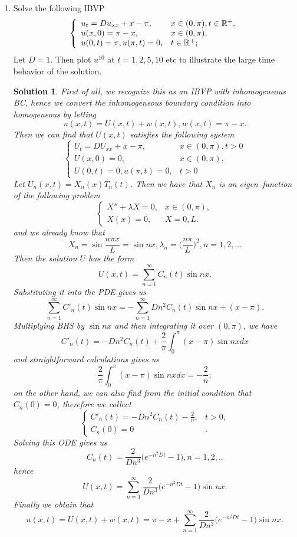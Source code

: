 \documentclass[6pt]{article}
\newtheorem{solution}{Solution}
\numberwithin{equation}{section}
\def\mathbb{\Bbb}
\begin{document}
\begin{enumerate}
\item Solve the following IBVP
\begin{equation}\label{4}
\left\{
\begin{array}{ll}
u_t=Du_{xx}+x-\pi,& x\in(0,\pi),t\in\mathbb R^+,\\
u(x,0)=\pi-x,&x\in(0,\pi),\\
u(0,t)=\pi, u(\pi,t)=0, &t\in\mathbb R^+;
\end{array}
\right.
\end{equation}
Let $D=1$.  Then plot $u^{10}$ at $t=1,2,5,10$ etc to illustrate the large time behavior of the solution.
\begin{solution}
First of all, we recognize this as an IBVP with inhomogeneous BC, hence we convert the inhomogeneous boundary condition into homogeneous by letting
\[u(x,t)=U(x,t)+w(x,t),w(x,t)=\pi-x.\]
Then we can find that $U(x,t)$ satisfies the following system
\begin{equation}\label{4homo}
\left\{
\begin{array}{ll}
U_t=DU_{xx}+x-\pi,& x\in(0,\pi),t>0\\
U(x,0)=0,&x\in(0,\pi),\\
U(0,t)=0, u(\pi,t)=0, &t>0
\end{array}
\right.
\end{equation}
Let $U_n(x,t)=X_n(x)T_n(t)$.  Then we have that $X_n$ is an eigen--function of the following problem
\begin{equation}
\left\{
\begin{array}{ll}
X''+\lambda X=0,& x\in(0,\pi),\\
X(x)=0, &X=0,L.
\end{array}
\right.
\end{equation}
and we already know that
\[X_n=\sin \frac{n\pi x}{L}=\sin nx,\lambda_n=\Big(\frac{n\pi}{L}\Big)^2,n=1,2,...\]
Then the solution $U$ has the form
\[U(x,t)=\sum_{n=1}^\infty C_n(t)\sin nx.\]
Substituting it into the PDE gives us
\[\sum_{n=1}^\infty C'_n(t)\sin nx=-\sum_{n=1}^\infty Dn^2C_n(t)\sin nx+(x-\pi).\]
Multiplying BHS by $\sin nx$ and then integrating it over $(0,\pi)$, we have
\[C'_n(t)=-Dn^2C_n(t)+\frac{2}{\pi}\int_0^\pi(x-\pi)\sin nx dx\]
and straightforward calculations gives us
\[\frac{2}{\pi}\int_0^\pi(x-\pi)\sin nx dx=-\frac{2}{n};\]
on the other hand, we can also find from the initial condition that $C_n(0)=0$, therefore we collect
\begin{equation}
\left\{
\begin{array}{ll}
C'_n(t)=-Dn^2C_n(t)-\frac{2}{n},& t>0,\\
C_n(0)=0 &.
\end{array}
\right.
\end{equation}
Solving this ODE gives us
\[C_n(t)=\frac{2}{Dn^3}\Big(e^{-n^2Dt}-1\Big),n=1,2,..\]
hence
\[U(x,t)=\sum_{n=1}^\infty \frac{2}{Dn^3}\Big(e^{-n^2Dt}-1\Big)\sin nx.\]
Finally we obtain that
\[u(x,t)=U(x,t)+w(x,t)=\pi-x+\sum_{n=1}^\infty \frac{2}{Dn^3}\Big(e^{-n^2Dt}-1\Big)\sin nx.\]


\end{solution}
\end{enumerate}
\end{document}
